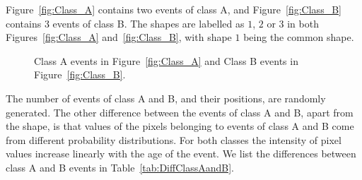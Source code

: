 \documentclass[a4paper,11pt]{article}
\begin{document}
Figure~\ref{fig:Class_A} contains two events of class A, and Figure~\ref{fig:Class_B} contains 3 events of class B. The shapes are labelled as $1$, $2$ or $3$ in both Figures~\ref{fig:Class_A} and~\ref{fig:Class_B}, with shape $1$ being the common shape.


\begin{figure}[!hbt]
	\centering
	\caption{Class A events in Figure~\ref{fig:Class_A} and Class B events in Figure~\ref{fig:Class_B}.}
	\label{fig:Classes_A_And_B}
\end{figure}

The number of events of class A and B, and their positions, are randomly generated. The other difference between the events of class A and B, apart from the shape, is that values of the pixels belonging to events of class A and B come from different probability distributions. For both classes the intensity of pixel values increase linearly with the age of the event. We list the differences between class A and B events in Table~\ref{tab:DiffClassAandB}.
\end{document}
